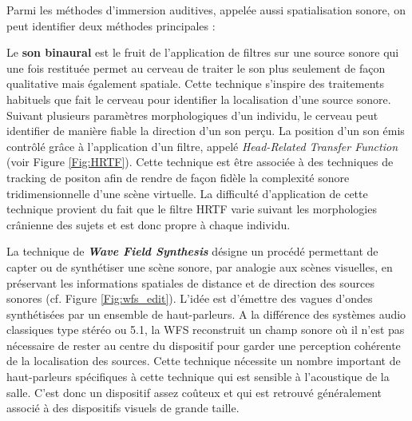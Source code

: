 Parmi les méthodes d'immersion auditives, appelée aussi spatialisation sonore, on peut identifier deux méthodes principales :

Le \textbf{son binaural} est le fruit de l'application de filtres sur une source sonore qui une fois restituée permet au cerveau de traiter le son plus seulement de façon qualitative mais également spatiale. Cette technique s'inspire des traitements habituels que fait le cerveau pour identifier la localisation d'une source sonore. Suivant plusieurs paramètres morphologiques d'un individu, le cerveau peut identifier de manière fiable la direction d'un son perçu. La position d'un son émis contrôlé grâce à l'application d'un filtre, appelé \textit{Head-Related Transfer Function} (voir Figure \ref{Fig:HRTF}). Cette technique est être associée à des techniques de tracking de positon afin de rendre de façon fidèle la complexité sonore tridimensionnelle d'une scène virtuelle. La difficulté d'application de cette technique provient du fait que le filtre HRTF varie suivant les morphologies crânienne des sujets et est donc propre à chaque individu.

La technique de \textit{\textbf{Wave Field Synthesis}} désigne un procédé permettant de capter ou de synthétiser une scène sonore, par analogie aux scènes visuelles, en préservant les informations spatiales de distance et de direction des sources sonores (cf. Figure \ref{Fig:wfs_edit}). L'idée est d'émettre des vagues d'ondes synthétisées par un ensemble de haut-parleurs. A la différence des systèmes audio classiques type stéréo ou 5.1, la WFS reconstruit un champ sonore où il n'est pas nécessaire de rester au centre du dispositif pour garder une perception cohérente de la localisation des sources.
Cette technique nécessite un nombre important de haut-parleurs spécifiques à cette technique qui est sensible à l'acoustique de la salle. C'est donc un dispositif assez coûteux et qui est retrouvé généralement associé à des dispositifs visuels de grande taille.

